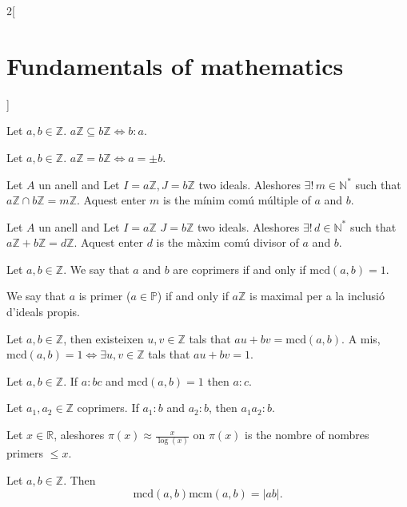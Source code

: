 \documentclass[../../../main.tex]{subfiles}
\begin{document}
\begin{multicols}{2}[\section{Fundamentals of mathematics}]
    \begin{prop}
    Let $a,b\in \mathbb{Z}$. $a\mathbb{Z}\subseteq b\mathbb{Z}\iff b: a$.
    \end{prop}
    \begin{corollary}
    Let $a,b\in \mathbb{Z}$. $a\mathbb{Z}=b\mathbb{Z}\iff a=\pm b$.
    \end{corollary}
    \begin{prop}
    Let $A$ un anell and Let $I=a\mathbb{Z},J=b\mathbb{Z}$ two ideals. Aleshores $\exists!\,m\in\mathbb{N}^*$ such that $a\mathbb{Z}\cap b\mathbb{Z}=m\mathbb{Z}$. Aquest enter $m$ is the mínim comú múltiple of $a$ and $b$.
    \end{prop}
    \begin{prop}
    Let $A$ un anell and Let $I=a\mathbb{Z}$ $J=b\mathbb{Z}$ two ideals. Aleshores $\exists!\,d\in\mathbb{N}^*$ such that $a\mathbb{Z}+b\mathbb{Z}=d\mathbb{Z}$. Aquest enter $d$ is the màxim comú divisor of $a$ and $b$.
    \end{prop}
    \begin{definition}
    Let $a,b\in\mathbb{Z}$. We say that $a$ and $b$ are coprimers if and only if $\text{mcd}(a,b)=1$.
    \end{definition}
    \begin{definition}
    We say that $a$ is primer ($a\in\mathbb{P}$) if and only if $a\mathbb{Z}$ is maximal per a la inclusió d'ideals propis.
    \end{definition}
    \begin{theorem}
    Let $a,b\in\mathbb{Z}$, then existeixen $u,v\in\mathbb{Z}$ tals that $au+bv=\text{mcd}(a,b)$. A mis, $\text{mcd}(a,b)=1\iff\exists u,v\in\mathbb{Z}$ tals that $au+bv=1$.
    \end{theorem}
    \begin{theorem}
    Let $a,b\in\mathbb{Z}$. If $a: bc$ and $\text{mcd}(a,b)=1$ then $a: c$.
    \end{theorem}
    \begin{corollary}
    Let $a_1,a_2\in\mathbb{Z}$ coprimers. If $a_1: b$ and $a_2: b$, then $a_1a_2: b$.
    \end{corollary}
    \begin{theorem}
    Let $x\in\mathbb{R}$, aleshores $\pi(x)\approx\frac{x}{\log(x)}$ on $\pi(x)$ is the nombre of nombres primers $\leq x$.
    \end{theorem}
    \begin{theorem}
    Let $a,b\in\mathbb{Z}$. Then $$\text{mcd}(a,b)\text{mcm}(a,b)=|ab|.$$

\end{theorem}
\end{multicols}
\end{document}
